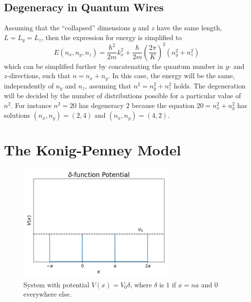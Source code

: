 \documentclass[11pt]{amsart}
\begin{document}
\subsection{Degeneracy in Quantum Wires}
Assuming that the ``collapsed'' dimensions $y$ and $z$ have the same length, $L=L_y =L_z$, then the expression for energy is simplified to
\begin{equation}
E(n_x, n_y, n_z) = \frac{\hbar^2}{2m}k_x^2 + \frac{\hbar}{2m}\left(\frac{2\pi}{K} \right)^2 (n_y^2 + n_z^2)
\end{equation}
which can be simplified further by concatenating the quantum number in $y$- and $z$-directions, such that $n = n_x + n_y$. In this case, the energy will be the same, independently of $n_y$ and $n_z$, assuming that $n^2 = n_y^2 + n_z^2$ holds. The degeneration will be decided by the number of distributions possible for a particular value of $n^2$. For instance $n^2 = 20$ has degeneracy $2$ because the equation $20 = n_x^2 + n_y^2$ has solutions $(n_x, n_y) = (2, 4)$ and $(n_x, n_y) = (4, 2)$.

\section{The Konig-Penney Model}
\begin{figure}
\centering
	\includegraphics[width=0.7\textwidth]{deltapotential.png}
	\caption{System with potential $V(x) = V_0\delta$, where $\delta$ is $1$ if $x=na$ and $0$ everywhere else.}
	\label{fig:deltapotential}	
\end{figure}
\end{document}
